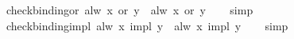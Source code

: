 \begin{isabellebody}
%
\isadelimproof
\isanewline
%
\endisadelimproof
\isanewline
{}\isamarkupfalse%
\ check{\isacharunderscore}binding{\isacharunderscore}or{\isacharcolon}\ {\isachardoublequoteopen}{\isacharparenleft}alw\ x\ or\ y{\isacharparenright}\ {\isacharequal}\ {\isacharparenleft}alw\ x{\isacharparenright}\ or\ y{\isachardoublequoteclose}\isanewline
%
\isadelimproof
\ \ %
\endisadelimproof
%
\isatagproof
{}\isamarkupfalse%
\ simp%
\endisatagproof
{\isafoldproof}%
%
\isadelimproof
\isanewline
%
\endisadelimproof
\isanewline
{}\isamarkupfalse%
\ check{\isacharunderscore}binding{\isacharunderscore}impl{\isacharcolon}\ {\isachardoublequoteopen}{\isacharparenleft}alw\ x\ impl\ y{\isacharparenright}\ {\isacharequal}\ {\isacharparenleft}alw\ x{\isacharparenright}\ impl\ y{\isachardoublequoteclose}\isanewline
%
\isadelimproof
\ \ %
\endisadelimproof
%
\isatagproof
{}\isamarkupfalse%
\ simp%
\endisatagproof
{\isafoldproof}%
%
\isadelimproof
\isanewline
%
\endisadelimproof
%
\isadelimtheory
\isanewline
%
\endisadelimtheory
%
\isatagtheory
{}\isamarkupfalse%
%
\endisatagtheory
{\isafoldtheory}%
%
\isadelimtheory
%
\endisadelimtheory
%
\end{isabellebody}%
\endinput

